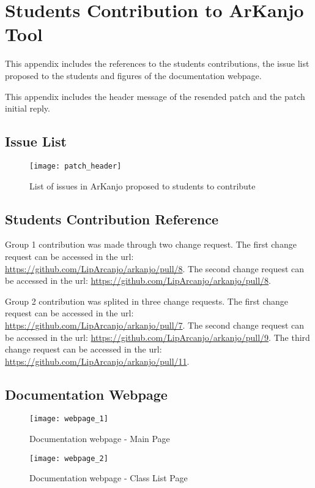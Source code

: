 \chapter{Students Contribution to ArKanjo Tool}

\label{app:contribution}

This appendix includes the references to the students contributions,
the issue list proposed to the students and figures of the documentation webpage.

This appendix includes the header message of the resended patch and the 
patch initial reply.

\section{Issue List}

\begin{figure}
\texttt{[image: patch\_header]}
\caption{List of issues in ArKanjo proposed to students to contribute}
\label{fig:issue_list}
\end{figure}

\newpage

\section{Students Contribution Reference}

Group 1 contribution was made through two change request.
The first change request can be accessed in the url: 
\url{https://github.com/LipArcanjo/arkanjo/pull/8}. 
The second change request can be accessed in the url: 
\url{https://github.com/LipArcanjo/arkanjo/pull/8}.

Group 2 contribution was splited in three change requests. The first change request
can be accessed in the url: \url{https://github.com/LipArcanjo/arkanjo/pull/7}.
The second change request can be accessed in the url:
\url{https://github.com/LipArcanjo/arkanjo/pull/9}. 
The third change request can be accessed in the 
url: \url{https://github.com/LipArcanjo/arkanjo/pull/11}.

\section{Documentation Webpage}

\begin{figure}
\texttt{[image: webpage\_1]}
\caption{Documentation webpage - Main Page}
\label{fig:webpage1}
\end{figure}

\begin{figure}
\texttt{[image: webpage\_2]}
\caption{Documentation webpage - Class List Page}
\label{fig:webpage2}
\end{figure}
